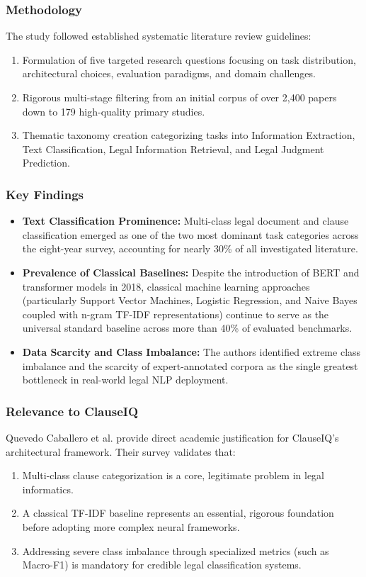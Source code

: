 \subsubsection*{Methodology}
The study followed established systematic literature review guidelines:
\begin{enumerate}
    \item Formulation of five targeted research questions focusing on task distribution, architectural choices, evaluation paradigms, and domain challenges.
    \item Rigorous multi-stage filtering from an initial corpus of over 2,400 papers down to 179 high-quality primary studies.
    \item Thematic taxonomy creation categorizing tasks into Information Extraction, Text Classification, Legal Information Retrieval, and Legal Judgment Prediction.
\end{enumerate}

\subsubsection*{Key Findings}
\begin{itemize}
    \item \textbf{Text Classification Prominence:} Multi-class legal document and clause classification emerged as one of the two most dominant task categories across the eight-year survey, accounting for nearly 30\% of all investigated literature.
    \item \textbf{Prevalence of Classical Baselines:} Despite the introduction of BERT and transformer models in 2018, classical machine learning approaches (particularly Support Vector Machines, Logistic Regression, and Naive Bayes coupled with n-gram TF-IDF representations) continue to serve as the universal standard baseline across more than 40\% of evaluated benchmarks.
    \item \textbf{Data Scarcity and Class Imbalance:} The authors identified extreme class imbalance and the scarcity of expert-annotated corpora as the single greatest bottleneck in real-world legal NLP deployment.
\end{itemize}

\subsubsection*{Relevance to ClauseIQ}
Quevedo Caballero et al. provide direct academic justification for ClauseIQ's architectural framework. Their survey validates that:
\begin{enumerate}
    \item Multi-class clause categorization is a core, legitimate problem in legal informatics.
    \item A classical TF-IDF baseline represents an essential, rigorous foundation before adopting more complex neural frameworks.
    \item Addressing severe class imbalance through specialized metrics (such as Macro-F1) is mandatory for credible legal classification systems.
\end{enumerate}

